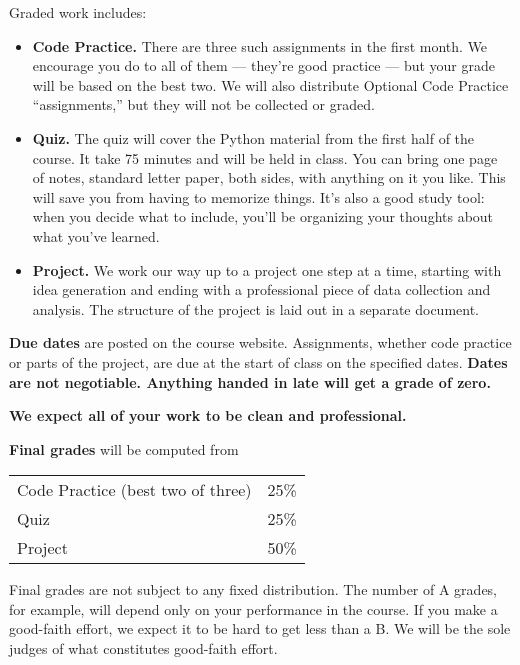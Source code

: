 \documentclass[11pt]{article}
\begin{document}
Graded work includes:
%  
\begin{itemize} 

\item {\bf Code Practice.\/} 
There are three such assignments in the first month. 
We encourage you do to all of them --- they're good practice ---
but your grade will be based on the best two.  
We will also distribute Optional Code Practice ``assignments,''
but they will not be collected or graded.  

\item {\bf Quiz.\/}  
The quiz will cover the Python material from the first half of the course.  
It take 75 minutes and will be held in class.
You can bring one page of notes, standard letter paper,
both sides, with anything on it you like.
This will save you from having to memorize things.
It's also a good study tool:  when you decide what to include,
you'll be organizing your thoughts about what you've learned.

\item {\bf Project.\/} 
We work our way up to a project one step at a time, starting with idea generation and ending
with a professional piece of data collection and analysis.
The structure of the project is laid out in a separate document.

\end{itemize} 


{\bf Due dates} are posted on the course website.  
Assignments, whether code practice or parts of the project,
are due at the start of class on the specified dates.
{\bf Dates are not negotiable.
Anything handed in late will get a grade of zero.\/}

{\bf We expect all of your work to be clean and professional.}   


{\bf Final grades\/} will be computed from
\begin{center}
\begin{tabular}{ll}
Code Practice (best two of three) & 25\% \\
Quiz        & 25\% \\
Project     & 50\% \\
\end{tabular}
\end{center}
Final grades are not subject to any fixed distribution.
The number of A grades, for example,
will depend only on your performance in the course.
If you make a good-faith effort,
we expect it to be hard to get less than a B.
We will be the sole judges of what constitutes good-faith effort.
\end{document}
